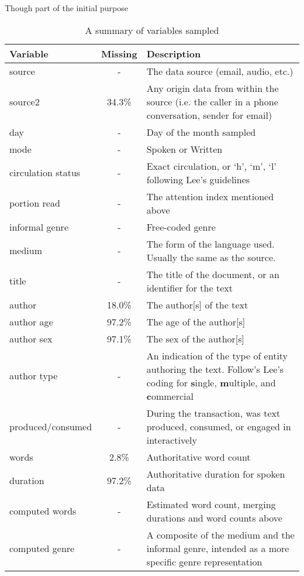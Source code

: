 Though part of the initial purpose 


\begin{table}[hp]
\centering
    \begin{tabular}{ | l | c | p{7cm} |}
    \hline
    \textbf{Variable} & \textbf{Missing} & \textbf{Description} \\ \hline
   
    source              & - & The data source (email, audio, etc.) \\ \hline
    source2             & 34.3\% & Any origin data from within the source (i.e. the caller in a phone conversation, sender for email) \\ \hline
    day                 & - & Day of the month sampled \\ \hline
    mode                & - & Spoken or Written \\ \hline
    circulation status  & - & Exact circulation, or `h', `m', `l' following Lee's guidelines\\ \hline
    portion read        & - & The attention index mentioned above \\ \hline
    informal genre      & - & Free-coded genre \\ \hline
    medium              & - & The form of the language used.  Usually the same as the source. \\ \hline
    title               & - & The title of the document, or an identifier for the text \\ \hline
    author              & 18.0\% & The author[s] of the text\\ \hline
    author age          & 97.2\% & The age of the author[s] \\ \hline
    author sex          & 97.1\% & The sex of the author[s] \\ \hline
    author type         & - & An indication of the type of entity authoring the text.  Follow's Lee's coding for \textbf{s}ingle, \textbf{m}ultiple, and \textbf{c}ommercial\\ \hline
    produced/consumed   & - & During the transaction, was text produced, consumed, or engaged in interactively \\ \hline 
    words               & 2.8\% & Authoritative word count\\ \hline
    duration            & 97.2\% & Authoritative duration for spoken data\\ \hline
    computed words      & - & Estimated word count, merging durations and word counts above\\ \hline
    computed genre      & - & A composite of the medium and the informal genre, intended as a more specific genre representation \\
    \hline
    \end{tabular}
\caption{A summary of variables sampled}
\label{table:personal:variables}
\end{table}






